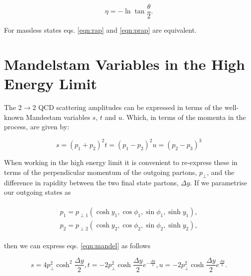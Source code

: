 		\begin{equation}
			\eta = -\ln\tan\frac{\theta}{2}.
			\label{eqn:prap}
		\end{equation}

		For massless states eqs. \eqref{eqn:rap} and \eqref{eqn:prap} are equivalent.

	\section{Mandelstam Variables in the High Energy Limit}
		\label{sub:MandelstamVariables}

		The $2\rightarrow 2$ QCD scattering amplitudes can be expressed in terms of the well-known Mandestam
		variables $s$, $t$ and $u$.  Which, in terms of the momenta in the process, are given by:

		\begin{subequations}
			\begin{equation}
				s = (p_1 + p_2)^2
			\end{equation}
			\begin{equation}
				t = (p_1 - p_2)^2
			\end{equation}
			\begin{equation}
				u = (p_2 - p_3)^3
			\end{equation}
			\label{eqn:mandel}
		\end{subequations}

		When working in the high energy limit it is convenient to re-express these in terms of the
		perpendicular momentum of the outgoing partons, $p_\perp$, and the difference in rapidity
		between the two final state partons, $\Delta y$.  If we parametrise our outgoing states as

		\begin{align}
		\begin{split}
			p_1 = p_{\perp1}(\cosh y_1, \cos\phi_1, \sin\phi_1, \sinh y_1),\\
			p_2 = p_{\perp2}(\cosh y_2, \cos\phi_2, \sin\phi_2, \sinh y_2),
		\end{split}
		\end{align}

		then we can express eqs. \eqref{eqn:mandel} as follows

		\begin{subequations}
			\begin{equation}
				s = 4p_\perp^2 \cosh^2\frac{\Delta y}{2},
			\end{equation}
			\begin{equation}
				t = -2p_\perp^2 \cosh\frac{\Delta y}{2}e^{-\frac{\Delta y}{2}},
			\end{equation}
			\begin{equation}
				u = -2p_\perp^2 \cosh\frac{\Delta y}{2}e^{\frac{\Delta y}{2}}.
			\end{equation}
		\end{subequations}

